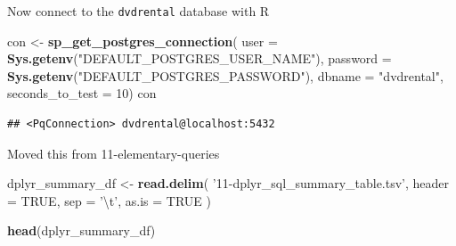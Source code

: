 \documentclass[]{book}
\newenvironment{Shaded}{\begin{snugshade}}{\end{snugshade}}
\newcommand{\CharTok}[1]{\textcolor[rgb]{0.31,0.60,0.02}{#1}}
\newcommand{\CommentTok}[1]{\textcolor[rgb]{0.56,0.35,0.01}{\textit{#1}}}
\newcommand{\ControlFlowTok}[1]{\textcolor[rgb]{0.13,0.29,0.53}{\textbf{#1}}}
\newcommand{\DataTypeTok}[1]{\textcolor[rgb]{0.13,0.29,0.53}{#1}}
\newcommand{\DecValTok}[1]{\textcolor[rgb]{0.00,0.00,0.81}{#1}}
\newcommand{\KeywordTok}[1]{\textcolor[rgb]{0.13,0.29,0.53}{\textbf{#1}}}
\newcommand{\NormalTok}[1]{#1}
\newcommand{\OperatorTok}[1]{\textcolor[rgb]{0.81,0.36,0.00}{\textbf{#1}}}
\newcommand{\OtherTok}[1]{\textcolor[rgb]{0.56,0.35,0.01}{#1}}
\newcommand{\StringTok}[1]{\textcolor[rgb]{0.31,0.60,0.02}{#1}}
\theoremstyle{definition}
\theoremstyle{definition}
\theoremstyle{definition}
\theoremstyle{remark}
\begin{document}
Now connect to the \texttt{dvdrental} database with R

\begin{Shaded}
\begin{Highlighting}[]
\NormalTok{con <-}\StringTok{ }\KeywordTok{sp_get_postgres_connection}\NormalTok{(}
  \DataTypeTok{user =} \KeywordTok{Sys.getenv}\NormalTok{(}\StringTok{"DEFAULT_POSTGRES_USER_NAME"}\NormalTok{),}
  \DataTypeTok{password =}  \KeywordTok{Sys.getenv}\NormalTok{(}\StringTok{"DEFAULT_POSTGRES_PASSWORD"}\NormalTok{),}
  \DataTypeTok{dbname =} \StringTok{"dvdrental"}\NormalTok{,}
  \DataTypeTok{seconds_to_test =} \DecValTok{10}\NormalTok{)}
\NormalTok{con}
\end{Highlighting}
\end{Shaded}

\begin{verbatim}
## <PqConnection> dvdrental@localhost:5432
\end{verbatim}

\begin{Shaded}
\end{Shaded}

Moved this from 11-elementary-queries

\begin{Shaded}
\begin{Highlighting}[]
\NormalTok{dplyr_summary_df <-}
\StringTok{    }\KeywordTok{read.delim}\NormalTok{(}
    \StringTok{'11-dplyr_sql_summary_table.tsv'}\NormalTok{,}
    \DataTypeTok{header =} \OtherTok{TRUE}\NormalTok{,}
    \DataTypeTok{sep =} \StringTok{'}\CharTok{\textbackslash{}t}\StringTok{'}\NormalTok{,}
    \DataTypeTok{as.is =} \OtherTok{TRUE}
\NormalTok{    )}

\KeywordTok{head}\NormalTok{(dplyr_summary_df)}
\end{Highlighting}
\end{Shaded}
\end{document}
